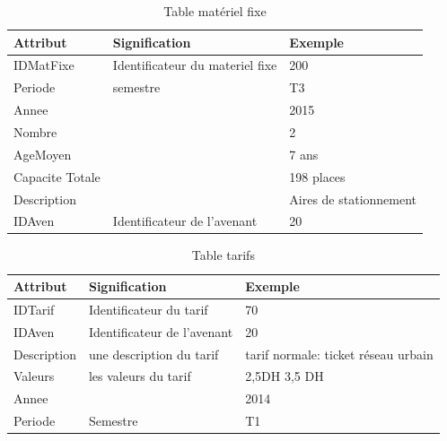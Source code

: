 \documentclass[a4paper]{report}
\begin{document}
\begin{doublespace}
	\begin{table}[H]
		\begin{center}
			\begin{tabularx}{17.5cm}{|X|X|X|}
				\hline
				\textbf{Attribut} & \textbf{Signification}          &
				\textbf{Exemple}                                                             \\
				\hline
				IDMatFixe         & Identificateur du materiel fixe & 200                    \\
				\hline
				Periode           & semestre                        & T3                     \\
				\hline
				Annee             &                                 & 2015                   \\
				\hline
				Nombre            &                                 & 2                      \\
				\hline
				AgeMoyen          &                                 & 7 ans                  \\
				\hline
				Capacite Totale   &                                 & 198 places             \\
				\hline
				Description       &                                 & Aires de stationnement \\
				\hline
				IDAven            & Identificateur de l'avenant     & 20                     \\
				\hline
			\end{tabularx}
			\caption{Table matériel fixe}
		\end{center}
	\end{table}
	
			\begin{table}[H]
		\begin{center}
			\begin{tabularx}{17.5cm}{|X|X|X|}
				\hline
				\textbf{Attribut} & \textbf{Signification}      &
				\textbf{Exemple}                                                        \\
				\hline
				IDTarif           & Identificateur du tarif     & 70                    \\
				\hline
				IDAven            & Identificateur de l'avenant & 20                    \\
				\hline
				Description       & une description du tarif    & tarif normale: ticket
				réseau urbain                                                           \\
				\hline
				Valeurs           & les valeurs du tarif        & 2,5DH 3,5 DH          \\
				\hline
				Annee             &                             & 2014                  \\
				\hline
				Periode           & Semestre                    & T1                    \\
				\hline
			\end{tabularx}
			\caption{Table tarifs}
		\end{center}
	\end{table}


\end{doublespace}
\end{document}
